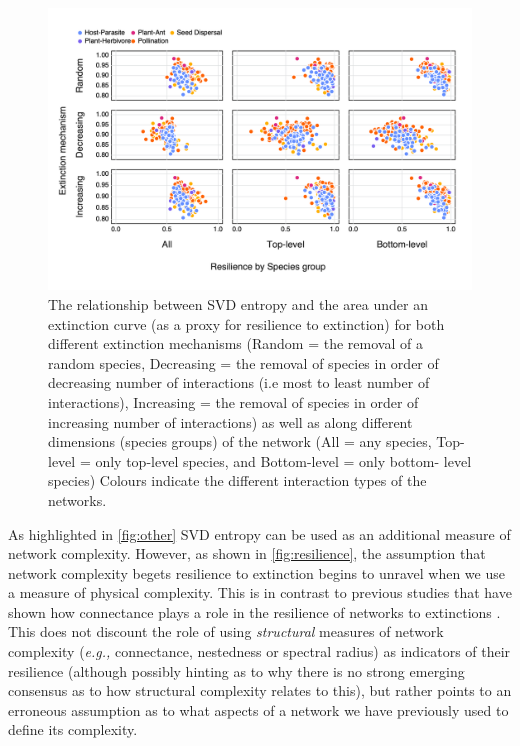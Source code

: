 \begin{figure}[h]
    \centering
    \includegraphics[width=\textwidth]{figures/entropy_v_AUCall.png}
    \caption{The relationship between SVD entropy and the area under an
extinction curve (as a proxy for resilience to extinction) for both different
extinction mechanisms (Random = the removal of a random species, Decreasing =
the removal of species in order of decreasing number of interactions (i.e most
to least number of interactions), Increasing = the removal of species in order
of increasing number of interactions) as well as along different dimensions
(species groups) of the network (All = any species, Top-level = only top-level
species, and Bottom-level = only bottom- level species) Colours indicate the
different interaction types of the networks.}
    \label{fig:resilience}
\end{figure}

As highlighted in \autoref{fig:other} SVD entropy can be used as an additional
measure of network complexity. However, as shown in \autoref{fig:resilience}, the
assumption that network complexity begets resilience to extinction begins to
unravel when we use a measure of physical complexity. This is in contrast to
previous studies that have shown how connectance plays a role in the resilience
of networks to extinctions \cite{Dunne2002NetStr, Memmott2004TolPol}. This does
not discount the role of using \emph{structural} measures of network complexity
(\emph{e.g.,} connectance, nestedness or spectral radius) as indicators of their
resilience (although possibly hinting as to why there is no strong emerging
consensus as to how structural complexity relates to this), but rather points to
an erroneous assumption as to what aspects of a network we have previously used
to define its complexity.

